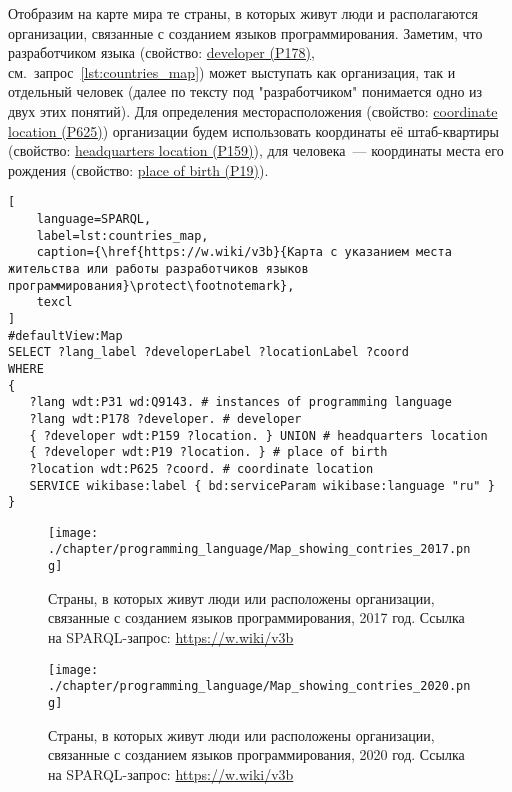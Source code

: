 Отобразим на карте мира те страны, в которых живут люди и располагаются организации, связанные с созданием языков программирования. Заметим, что разработчиком языка (свойство: \href{https://www.wikidata.org/wiki/Property:P178}{developer (P178)}, см.~запрос~\ref{lst:countries_map}) может выступать как организация, так и отдельный человек (далее по тексту под "разработчиком" понимается одно из двух этих понятий). Для определения месторасположения (свойство: \href{https://www.wikidata.org/wiki/Property:P625}{coordinate location (P625)}) организации будем использовать координаты её штаб-квартиры (свойство: \href{https://www.wikidata.org/wiki/Property:P159}{headquarters location (P159)}), для человека~--- координаты места его рождения (свойство: \href{https://www.wikidata.org/wiki/Property:P19}{place of birth (P19)}).

\begin{lstlisting}[
	language=SPARQL,
	label=lst:countries_map,
	caption={\href{https://w.wiki/v3b}{Карта с указанием места жительства или работы разработчиков языков программирования}\protect\footnotemark},
	texcl
]
#defaultView:Map
SELECT ?lang_label ?developerLabel ?locationLabel ?coord
WHERE
{
   ?lang wdt:P31 wd:Q9143. # instances of programming language
   ?lang wdt:P178 ?developer. # developer
   { ?developer wdt:P159 ?location. } UNION # headquarters location
   { ?developer wdt:P19 ?location. } # place of birth
   ?location wdt:P625 ?coord. # coordinate location
   SERVICE wikibase:label { bd:serviceParam wikibase:language "ru" } 	
}
\end{lstlisting}


\begin{figure}[h]
\centering
	\texttt{[image: ./chapter/programming\_language/Map\_showing\_contries\_2017.png]}
	\caption[Страны, в которых живут люди или расположены организации, связанные с созданием языков программирования, 2017 год.]{Страны, в которых живут люди или расположены организации, связанные с созданием языков программирования, 2017 год. Ссылка на SPARQL-запрос: \href{https://w.wiki/v3b}{https://w.wiki/v3b}}
	\label{fig:countries_2017}
\end{figure}
\begin{figure}
\centering
	\texttt{[image: ./chapter/programming\_language/Map\_showing\_contries\_2020.png]}
	\caption[Страны, в которых живут люди или расположены организации, связанные с созданием языков программирования, 2020 год.]{Страны, в которых живут люди или расположены организации, связанные с созданием языков программирования, 2020 год. Ссылка на SPARQL-запрос: \href{https://w.wiki/v3b}{https://w.wiki/v3b}}
	\label{fig:countries_2020}
\end{figure}

